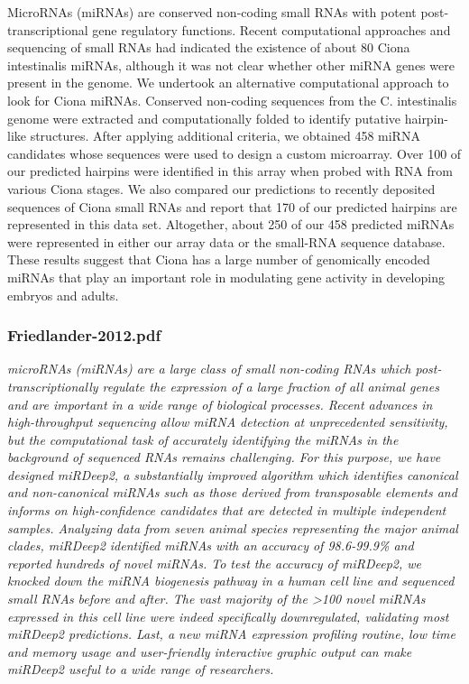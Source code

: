 \cite{Keshavan2010}
MicroRNAs (miRNAs) are conserved non-coding small RNAs with potent post-transcriptional gene
regulatory functions. Recent computational approaches and sequencing of small RNAs had indicated
the existence of about 80 Ciona intestinalis miRNAs, although it was not clear whether other
miRNA genes were present in the genome. We undertook an alternative computational approach
to look for Ciona miRNAs. Conserved non-coding sequences from the C. intestinalis genome were
extracted and computationally folded to identify putative hairpin-like structures. After applying additional
criteria, we obtained 458 miRNA candidates whose sequences were used to design a custom
microarray. Over 100 of our predicted hairpins were identified in this array when probed with RNA
from various Ciona stages. We also compared our predictions to recently deposited sequences of
Ciona small RNAs and report that 170 of our predicted hairpins are represented in this data set.
Altogether, about 250 of our 458 predicted miRNAs were represented in either our array data or the
small-RNA sequence database. These results suggest that Ciona has a large number of genomically
encoded miRNAs that play an important role in modulating gene activity in developing
embryos and adults.


\subsubsection{Friedlander-2012.pdf}
\cite{Friedlander2012}
\textit{microRNAs (miRNAs) are a large class of small non-coding RNAs which post-transcriptionally regulate the expression of a large fraction of all animal genes and are important in a wide range of biological processes. Recent advances in high-throughput sequencing allow miRNA detection at unprecedented sensitivity, but the computational task of accurately identifying the miRNAs in the background of sequenced RNAs remains challenging. For this purpose, we have designed miRDeep2, a substantially improved algorithm which identifies canonical and non-canonical miRNAs such as those derived from transposable elements and informs on high-confidence candidates that are detected in multiple independent samples. Analyzing data from seven animal species representing the major animal clades, miRDeep2 identified miRNAs with an accuracy of 98.6-99.9{\%} and reported hundreds of novel miRNAs. To test the accuracy of miRDeep2, we knocked down the miRNA biogenesis pathway in a human cell line and sequenced small RNAs before and after. The vast majority of the {\textgreater}100 novel miRNAs expressed in this cell line were indeed specifically downregulated, validating most miRDeep2 predictions. Last, a new miRNA expression profiling routine, low time and memory usage and user-friendly interactive graphic output can make miRDeep2 useful to a wide range of researchers.}

